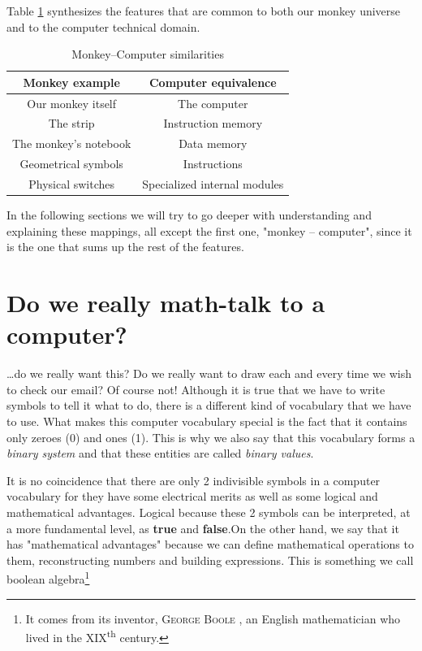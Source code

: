 \documentclass[12pt, a4paper]{book}
\newcommand{\InsertProperName}[1]{
  \textsc{#1}
}
\begin{document}
Table \ref{tab:monkey-computer similarities} synthesizes the features that are common to both our monkey universe and to the computer technical domain.

\begin{table}
  \centering
  \renewcommand{\arraystretch}{2.0}
  \begin{tabular}{| c | c |}
    \hline
    \cellcolor{blue!15}\textbf{Monkey example}
    & 
    \cellcolor{blue!15}\textbf{Computer equivalence} \\  \hline

    Our monkey itself & The computer \\ \hline
    The strip & Instruction memory \\ \hline
    The monkey's notebook & Data memory \\ \hline
    Geometrical symbols & Instructions \\ \hline
    Physical switches & Specialized internal modules \\ \hline
  \end{tabular}
  \caption{Monkey--Computer similarities}
  \label{tab:monkey-computer similarities}
  \renewcommand{\arraystretch}{1.0}
\end{table}

In the following sections we will try to go deeper with understanding and explaining these mappings, all except the first one, "monkey -- computer", since it is the one that sums up the rest of the features.

\section{Do we really math-talk to a computer?}

\ldots do we really want this? Do we really want to draw each and every time we wish to check our email? Of course not! Although it is true that we have to write symbols to tell it what to do, there is a different kind of vocabulary that we have to use. What makes this computer vocabulary special is the fact that it contains only zeroes (0) and ones (1). This is why we also say that this vocabulary forms a \textit{binary system} and that these entities are called \textit{binary values}. 

It is no coincidence that there are only 2 indivisible symbols in a computer vocabulary for they have some electrical merits as well as some logical and mathematical advantages. Logical because these 2 symbols can be interpreted, at a more fundamental level, as \textbf{true} and \textbf{false}.On the other hand, we say that it has "mathematical advantages" because we can define mathematical operations to them, reconstructing numbers and building expressions. This is something we call boolean algebra\footnote{It comes from its inventor, \InsertProperName{George Boole}, an English mathematician who lived in the \textsc{XIX}\textsuperscript{th} century.} 
\end{document}
